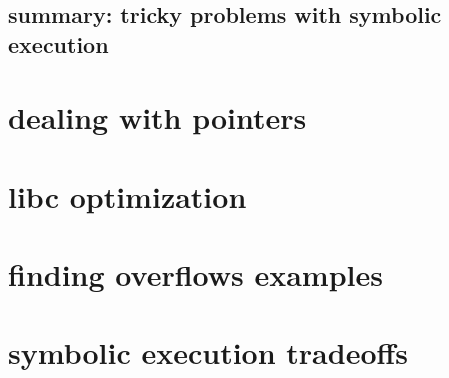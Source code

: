 \subsection{summary: tricky problems with symbolic execution}


\section{dealing with pointers}



\section{libc optimization}


\section{finding overflows examples}


\section{symbolic execution tradeoffs}

